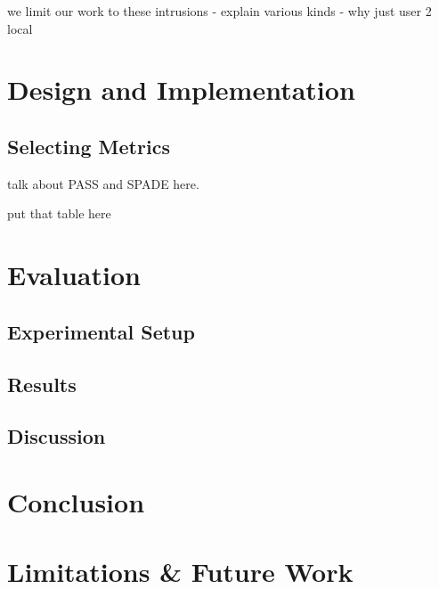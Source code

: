 \documentclass[10pt,twocolumn]{article}
\begin{document}
we limit our work to these intrusions
- explain various kinds
- why just user 2 local



%

\section{Design and Implementation}

\subsection{Selecting Metrics}

talk about PASS and SPADE here.

put that table here

%

\section{Evaluation}

\subsection{Experimental Setup}

\subsection{Results}

\subsection{Discussion}


%

\section{Conclusion}

\section{Limitations \& Future Work}


%
\end{document}

